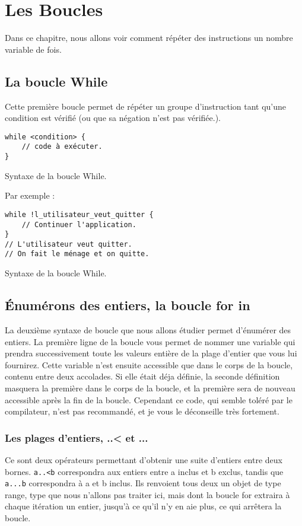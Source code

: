 \chapter{Les Boucles}
Dans ce chapitre, nous allons voir comment
répéter des instructions un nombre variable de fois.
\section{La boucle While}
Cette première boucle permet de répéter un groupe d'instruction tant qu'une condition est vérifié (ou que sa négation n'est pas vérifiée.).

\begin{listing}[h]
\begin{verbatim}
while <condition> {
    // code à exécuter.
}
\end{verbatim}
\caption{Syntaxe de la boucle While.}
\end{listing}

Par exemple :
\begin{listing}[h]
\begin{verbatim}
while !l_utilisateur_veut_quitter {
    // Continuer l'application.
}
// L'utilisateur veut quitter.
// On fait le ménage et on quitte.
\end{verbatim}
\caption{Syntaxe de la boucle While.}
\end{listing}

\section{Énumérons des entiers, la boucle for in}
La deuxième syntaxe de boucle que nous allons étudier permet d'énumérer des entiers.
La première ligne de la boucle vous permet de nommer une variable qui prendra successivement toute les valeurs entière de la plage d'entier que vous lui fournirez.
Cette variable n'est ensuite accessible que dans le corps de la boucle,
contenu entre deux accolades.
Si elle était déja définie,
la seconde définition masquera la première dans le corps de la boucle,
et la première sera de nouveau accessible après la fin de la boucle.
Cependant ce code, qui semble toléré par le compilateur,
n'est pas recommandé, et je vous le déconseille très fortement.
\subsection{Les plages d'entiers, ..< et ...}
Ce sont deux opérateurs permettant d'obtenir une suite d'entiers entre deux bornes. \verb"a..<b" correspondra aux entiers entre a inclus et b exclus, tandis que \verb"a...b" correspondra à a et b inclus. Ils renvoient tous deux un objet de type range, type que nous n'allons pas traiter ici, mais dont la boucle for extraira à chaque itération un entier, jusqu'à ce qu'il n'y en aie plus, ce qui arrêtera la boucle.
